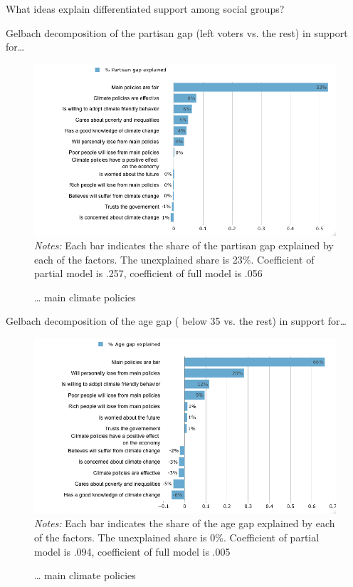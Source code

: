 \begin{framefont}{\small}
\begin{frame}{What ideas explain differentiated support among social groups?}
\end{frame}

\begin{frame}{Gelbach decomposition of the partisan gap (left voters vs. the rest) in support for…}%
\vspace{-.2cm}
\begin{figure}[h!]
\caption{… main climate policies}
\includegraphics[width=.7\textwidth]{../figures/FR/gelbach_vote_agg_index_main_policies} \\
{\tiny \textit{Notes:} Each bar indicates the share of the partisan gap explained by each of the factors. The unexplained share is 23\%. Coefficient of partial model is .257, coefficient of full model is .056}
\end{figure}
\end{frame}

\begin{frame}{Gelbach decomposition of the age gap ( below 35 vs. the rest) in support for…}%
\vspace{-.2cm}
\begin{figure}[h!]
\caption{… main climate policies}
\includegraphics[width=.7\textwidth]{../figures/FR/gelbach_young_index_main_policies} \\
{\tiny \textit{Notes:} Each bar indicates the share of the age gap explained by each of the factors. The unexplained share is 0\%. Coefficient of partial model is .094, coefficient of full model is .005}
\end{figure}
\end{frame}


\end{framefont}
